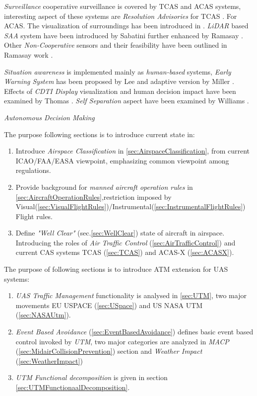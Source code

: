     \emph{Surveillance} cooperative surveillance is covered by TCAS and ACAS systems, interesting aspect of these systems are \emph{Resolution Advisories} \cite{kennedy1995resolution} for TCAS \cite{marston2015acas}. For ACAS. The visualization of surroundings has been introduced in \cite{blaskovich2007declutter}. \emph{LiDAR} based \emph{SAA} system have been introduced by Sabatini \cite{sabatini2014lidar} further enhanced by Ramasay \cite{ramasamy2016lidar}. Other \emph{Non-Cooperative} sensors and their feasibility have been outlined in Ramasay work \cite{ramasamy2014avionics}.
    
    \emph{Situation awareness} is implemented mainly as \emph{human-based} systems, \emph{Early Warning System} has been proposed by Lee \cite{lee2002collision} and adaptive version by Miller \cite{miller2002adaptive}. Effects of \emph{CDTI Display} visualization and human decision impact have been examined by Thomas \cite{thomas2005effects}. \emph{Self Separation} aspect have been examined by Williams \cite{williams1983self}.
    
    \emph{Autonomous Decision Making} 
    
    \begin{note}
        The purpose following sections is to introduce current state in:
        \begin{enumerate}
            \item Introduce \emph{Airspace Classification} in \ref{sec:AirspaceClassification}, from current ICAO/FAA/EASA viewpoint, emphasizing common viewpoint among regulations.
            \item Provide background for \emph{manned aircraft operation rules} in \ref{sec:AircraftOperationRules},restriction imposed by Visual(\ref{sec:VisualFlightRules})/Instrumental(\ref{sec:InstrumentalFlightRules}) Flight rules.
            \item Define \emph{"Well Clear"} (sec.\ref{sec:WellClear}) state of aircraft in airspace. Introducing the roles of \emph{Air Traffic Control} (\ref{sec:AirTrafficControl}) and current CAS systems TCAS (\ref{sec:TCAS}) and ACAS-X (\ref{sec:ACASX}).
        \end{enumerate}
        
        \noindent The purpose of following sections is to introduce ATM extension for UAS systems:
        \begin{enumerate}
            \item \emph{UAS Traffic Management} functionality is analysed in \ref{sec:UTM}, two major movements EU USPACE (\ref{sec:USpace}) and US NASA UTM (\ref{sec:NASAUtm}).
            \item \emph{Event Based Avoidance} (\ref{sec:EventBasedAvoidance}) defines basic event based control invoked by \emph{UTM}, two major categories are analyzed in \emph{MACP} (\ref{sec:MidairCollisionPrevention}) section and \emph{Weather Impact} (\ref{sec:WeatherImpact})
            \item \emph{UTM Functional decomposition} is given in section \ref{sec:UTMFunctionaalDecomposition}.
        \end{enumerate}
    \end{note}